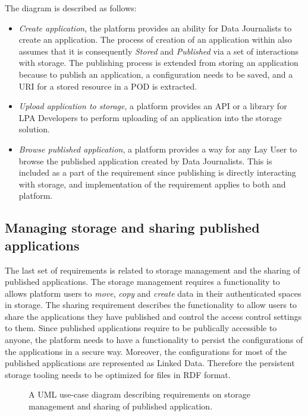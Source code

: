 The diagram is described as follows:
\begin{itemize}
    \item \textit{Create application}, the platform provides an ability for Data Journalists to create an application. The process of creation of an application within \lpa{} also assumes that it is consequently \textit{Stored} and \textit{Published} via a set of interactions with storage. The publishing process is extended from storing an application because to publish an application, a configuration needs to be saved, and a URI for a stored resource in a \solid{} POD is extracted.
    \item \textit{Upload application to storage}, a platform provides an API or a library for LPA Developers to perform uploading of an application into the storage solution.
    \item \textit{Browse published application}, a platform provides a way for any Lay User to browse the published application created by Data Journalists. This is included as a part of the requirement since publishing is directly interacting with storage, and implementation of the requirement applies to both \lpas{} and \lpa{} platform.
\end{itemize}


\subsection{Managing storage and sharing published applications}

The last set of requirements is related to storage management and the sharing of published applications. The storage management requires a functionality to allows platform users to \textit{move}, \textit{copy} and \textit{create} data in their authenticated spaces in storage. The sharing requirement describes the functionality to allow users to share the applications they have published and control the access control settings to them. Since published applications require to be publically accessible to anyone, the platform needs to have a functionality to persist the configurations of the applications in a secure way. Moreover, the configurations for most of the published applications are represented as Linked Data. Therefore the persistent storage tooling needs to be optimized for files in RDF format.
 
\begin{figure}[h]
\centering
{}
\caption{A UML use-case diagram describing requirements on storage management and sharing of published application.}
\label{fig:lpa_managing_storage}
\end{figure}

